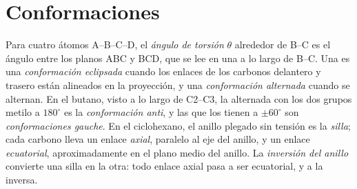 \section{Conformaciones}

\begin{definition}\label{def:b1:stereochemistry-in-depth:conformations}
Para cuatro átomos A--B--C--D, el \emph{ángulo de torsión}
$\theta$ alrededor de B--C es el ángulo entre los planos ABC y BCD, que
se lee en una  a lo largo de B--C. Una  es
una \emph{conformación eclipsada} cuando los enlaces de
los carbonos delantero y trasero están alineados en la proyección, y una
\emph{conformación alternada} cuando se alternan.
En el butano, visto a lo largo de C2--C3, la  alternada con
los dos grupos metilo a $180^\circ$ es la \emph{conformación anti},
y las que los tienen a $\pm 60^\circ$ son \emph{conformaciones
gauche}. En el ciclohexano, el anillo plegado sin
tensión es la \emph{silla}; cada carbono lleva un enlace
\emph{axial}, paralelo al eje del anillo, y un enlace
\emph{ecuatorial}, aproximadamente en el plano medio del
anillo. La \emph{inversión del anillo} convierte
una silla en la otra: todo enlace axial pasa a ser ecuatorial, y a la
inversa.
\end{definition}

